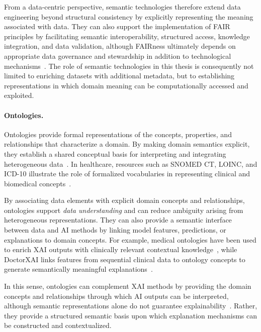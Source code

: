 From a data-centric perspective, semantic technologies therefore extend data engineering beyond structural consistency by explicitly representing the meaning associated with data. They can also support the implementation of FAIR principles by facilitating semantic interoperability, structured access, knowledge integration, and data validation, although FAIRness ultimately depends on appropriate data governance and stewardship in addition to technological mechanisms~\cite{rathee_semantic_2025}. The role of semantic technologies in this thesis is consequently not limited to enriching datasets with additional metadata, but to establishing representations in which domain meaning can be computationally accessed and exploited.

\paragraph{Ontologies.}

Ontologies provide formal representations of the concepts, properties, and relationships that characterize a domain. By making domain semantics explicit, they establish a shared conceptual basis for interpreting and integrating heterogeneous data~\cite{xhani_role_2025,amato_semfedxai_2025}. In healthcare, resources such as SNOMED CT, LOINC, and ICD-10 illustrate the role of formalized vocabularies in representing clinical and biomedical concepts~\cite{amato_semfedxai_2025}.

By associating data elements with explicit domain concepts and relationships, ontologies support \emph{data understanding} and can reduce ambiguity arising from heterogeneous representations. They can also provide a semantic interface between data and AI methods by linking model features, predictions, or explanations to domain concepts. For example, medical ontologies have been used to enrich XAI outputs with clinically relevant contextual knowledge~\cite{corbucci_semantic_2023}, while DoctorXAI links features from sequential clinical data to ontology concepts to generate semantically meaningful explanations~\cite{panigutti_role_2023}.

In this sense, ontologies can complement XAI methods by providing the domain concepts and relationships through which AI outputs can be interpreted, although semantic representations alone do not guarantee explainability~\cite{xhani_role_2025}. Rather, they provide a structured semantic basis upon which explanation mechanisms can be constructed and contextualized.

